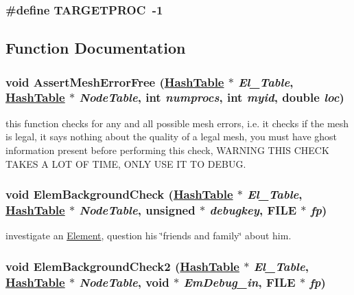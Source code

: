 \hypertarget{updatenei_8C_a0}{
\subsubsection[TARGETPROC]{\setlength{\rightskip}{0pt plus 5cm}\#define TARGETPROC\ -1}}
\label{updatenei_8C_a0}




\subsection{Function Documentation}
\hypertarget{updatenei_8C_a7}{
\subsubsection[AssertMeshErrorFree]{\setlength{\rightskip}{0pt plus 5cm}void Assert\-Mesh\-Error\-Free (\hyperlink{classHashTable}{Hash\-Table} $\ast$ {\em El\_\-Table}, \hyperlink{classHashTable}{Hash\-Table} $\ast$ {\em Node\-Table}, int {\em numprocs}, int {\em myid}, double {\em loc})}}
\label{updatenei_8C_a7}


this function checks for any and all possible mesh errors, i.e. it checks if the mesh is legal, it says nothing about the quality of a legal mesh, you must have ghost information present before performing this check, WARNING THIS CHECK TAKES A LOT OF TIME, ONLY USE IT TO DEBUG. 

\hypertarget{updatenei_8C_a2}{
\subsubsection[ElemBackgroundCheck]{\setlength{\rightskip}{0pt plus 5cm}void Elem\-Background\-Check (\hyperlink{classHashTable}{Hash\-Table} $\ast$ {\em El\_\-Table}, \hyperlink{classHashTable}{Hash\-Table} $\ast$ {\em Node\-Table}, unsigned $\ast$ {\em debugkey}, FILE $\ast$ {\em fp})}}
\label{updatenei_8C_a2}


investigate an \hyperlink{classElement}{Element}, question his \char`\"{}friends and family\char`\"{} about him. 

\hypertarget{updatenei_8C_a3}{
\subsubsection[ElemBackgroundCheck2]{\setlength{\rightskip}{0pt plus 5cm}void Elem\-Background\-Check2 (\hyperlink{classHashTable}{Hash\-Table} $\ast$ {\em El\_\-Table}, \hyperlink{classHashTable}{Hash\-Table} $\ast$ {\em Node\-Table}, void $\ast$ {\em Em\-Debug\_\-in}, FILE $\ast$ {\em fp})}}
\label{updatenei_8C_a3}


